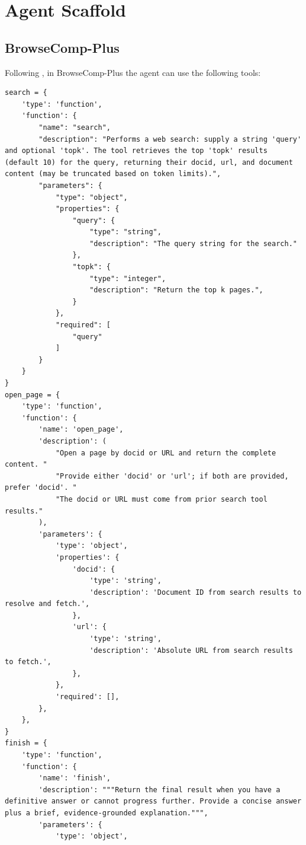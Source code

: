\section{Agent Scaffold}

\subsection{BrowseComp-Plus}

Following \citep{Chen2025BrowseCompPlusAM}, in BrowseComp-Plus the agent can use the following tools:
{\footnotesize
\begin{Verbatim}[breaklines, breakanywhere]
search = {
    'type': 'function',
    'function': {
        "name": "search",
        "description": "Performs a web search: supply a string 'query' and optional 'topk'. The tool retrieves the top 'topk' results (default 10) for the query, returning their docid, url, and document content (may be truncated based on token limits).",
        "parameters": {
            "type": "object",
            "properties": {
                "query": {
                    "type": "string",
                    "description": "The query string for the search."
                },
                "topk": {
                    "type": "integer",
                    "description": "Return the top k pages.",
                }
            },
            "required": [
                "query"
            ]
        }
    }
}
open_page = {
    'type': 'function',
    'function': {
        'name': 'open_page',
        'description': (
            "Open a page by docid or URL and return the complete content. "
            "Provide either 'docid' or 'url'; if both are provided, prefer 'docid'. "
            "The docid or URL must come from prior search tool results."
        ),
        'parameters': {
            'type': 'object',
            'properties': {
                'docid': {
                    'type': 'string',
                    'description': 'Document ID from search results to resolve and fetch.',
                },
                'url': {
                    'type': 'string',
                    'description': 'Absolute URL from search results to fetch.',
                },
            },
            'required': [],
        },
    },
}
finish = {
    'type': 'function',
    'function': {
        'name': 'finish',
        'description': """Return the final result when you have a definitive answer or cannot progress further. Provide a concise answer plus a brief, evidence-grounded explanation.""",
        'parameters': {
            'type': 'object',

\end{Verbatim}}
